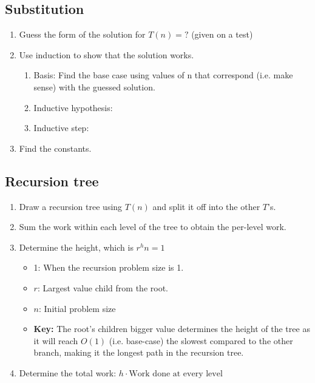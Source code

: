\documentclass{article}
\begin{document}
\subsection{Substitution}
\begin{process}
    \begin{enumerate}
        \item Guess the form of the solution for $T(n)=?$ (given on a test)
        \item Use induction to show that the solution works.
        \begin{enumerate}
            \item Basis: Find the base case using values of n that correspond (i.e. make sense) with the guessed solution.
            \item Inductive hypothesis:
            \item Inductive step:
        \end{enumerate}
        \item Find the constants.
    \end{enumerate}
\end{process}

\subsection{Recursion tree}
\begin{process}
    \begin{enumerate}
        \item Draw a recursion tree using $T(n)$ and split it off into the other $T$'s.
        \item Sum the work within each level of the tree to obtain the per-level work.
        \item Determine the height, which is $r^h n = 1$ 
        \begin{itemize}
            \item 1: When the recursion problem size is 1. 
            \item $r$: Largest value child from the root. 
            \item $n$: Initial problem size
            \item \textbf{Key:} The root's children bigger value determines the height of the tree as it will reach $O(1)$ (i.e. base-case) the slowest compared to the other branch, making it the longest path in the recursion tree. 
        \end{itemize}
        \item Determine the total work: $h \cdot \text{Work done at every level}$ 
    \end{enumerate}
\end{process}
\newpage
\end{document}
